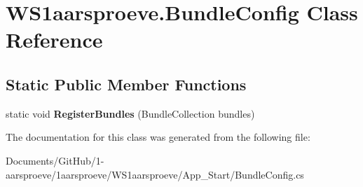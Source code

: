 \hypertarget{class_w_s1aarsproeve_1_1_bundle_config}{}\section{W\+S1aarsproeve.\+Bundle\+Config Class Reference}
\label{class_w_s1aarsproeve_1_1_bundle_config}
\subsection*{Static Public Member Functions}
\begin{DoxyCompactItemize}
\item 
\hypertarget{class_w_s1aarsproeve_1_1_bundle_config_a72934e29affaa05806c1b6d9e1779f7b}{}static void {\bfseries Register\+Bundles} (Bundle\+Collection bundles)\label{class_w_s1aarsproeve_1_1_bundle_config_a72934e29affaa05806c1b6d9e1779f7b}

\end{DoxyCompactItemize}


The documentation for this class was generated from the following file\+:\begin{DoxyCompactItemize}
\item 
Documents/\+Git\+Hub/1-\/aarsproeve/1aarsproeve/\+W\+S1aarsproeve/\+App\+\_\+\+Start/Bundle\+Config.\+cs\end{DoxyCompactItemize}
